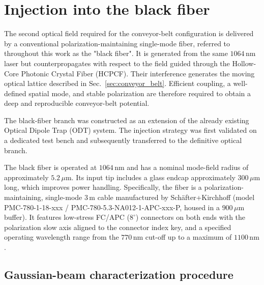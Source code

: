  
\providecommand{\tocomplete}[1]{\textbf{[TODO: #1]}}
 
\section{Injection into the black fiber}
\label{sec:black_fiber_injection}
 
The second optical field required for the conveyor-belt configuration is delivered by a conventional polarization-maintaining single-mode fiber, referred to throughout this work as the "black fiber". It is generated from the same $1064\,\mathrm{nm}$ laser but counterpropagates with respect to the field guided through the Hollow-Core Photonic Crystal Fiber (HCPCF). Their interference generates the moving optical lattice described in Sec.~\ref{sec:conveyor_belt}. Efficient coupling, a well-defined spatial mode, and stable polarization are therefore required to obtain a deep and reproducible conveyor-belt potential.

The black-fiber branch was constructed as an extension of the already existing Optical Dipole Trap (ODT) system. The injection strategy was first validated on a dedicated test bench and subsequently transferred to the definitive optical branch. 

The black fiber is operated at $1064\,\mathrm{nm}$ and has a nominal mode-field radius of approximately $5.2\,\mu\mathrm{m}$. Its input tip includes a glass endcap approximately $300\,\mu\mathrm{m}$ long, which improves power handling. Specifically, the fiber is a polarization-maintaining, single-mode $3\,\mathrm{m}$ cable manufactured by Sch\"{a}fter+Kirchhoff (model PMC-780-1-18-xxx / PMC-780-5.3-NA012-1-APC-xxx-P, housed in a $900\,\mu\mathrm{m}$ buffer). It features low-stress FC/APC ($8^\circ$) connectors on both ends with the polarization slow axis aligned to the connector index key, and a specified operating wavelength range from the $770\,\mathrm{nm}$ cut-off up to a maximum of $1100\,\mathrm{nm}$.

\subsection{Gaussian-beam characterization procedure}
\label{subsec:gaussian_beam}

